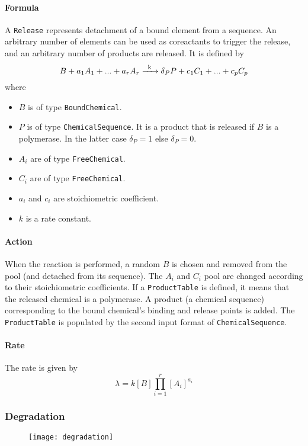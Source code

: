 \paragraph{Formula} A \texttt{Release} represents detachment of a bound element from a sequence. An arbitrary number of elements can be used as coreactants to trigger the release, and an arbitrary number of products are released. It is defined by
$$
	\reactionIrr{B + a_1 A_1 + ... + a_r A_r}{\delta_PP + c_1 C_1 + ... + c_p C_p }{k}{}
$$
where
\begin{itemize}
	\item $B$ is of type \texttt{BoundChemical}.
	\item $P$ is of type \texttt{ChemicalSequence}. It is a product that is released if $B$ is a polymerase. In the latter case $\delta_P = 1$ else $\delta_P = 0$.
	\item $A_i$ are of type \texttt{FreeChemical}.
	\item $C_i$ are of type \texttt{FreeChemical}.
	\item $a_i$ and $c_i$ are stoichiometric coefficient.
	\item $k$ is a rate constant.
\end{itemize}

\paragraph{Action} When the reaction is performed, a random $B$ is chosen and removed from the pool (and detached from its sequence). The $A_i$ and $C_i$ pool are changed according to their stoichiometric coefficients. If a \texttt{ProductTable} is defined, it means that the released chemical is a polymerase. A product (a chemical sequence) corresponding to the bound chemical's binding and release points is added. The \texttt{ProductTable} is populated by the second input format of \texttt{ChemicalSequence}.

\paragraph{Rate} The rate is given by
$$
	\lambda = k[B]\prod\limits_{i=1}^{r}[A_i]^{a_i}
$$

\subsubsection{Degradation}

\begin{figure}[!ht]
	\centering
	\texttt{[image: degradation]}
\end{figure}

